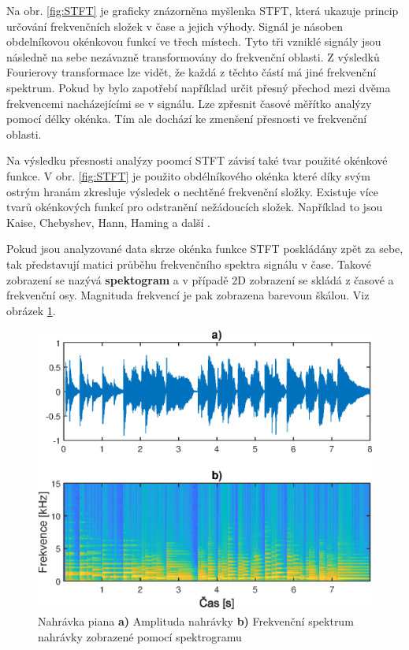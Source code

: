   Na obr. \ref{fig:STFT} je graficky znázorněna myšlenka \acs{STFT}, která ukazuje princip určování frekvenčních složek v čase a jejich výhody. 
  Signál je násoben obdelníkovou okénkovou funkcí ve třech místech.
  Tyto tři vzniklé signály jsou následně na sebe nezávazně transformovány do frekvenční oblasti.
  Z výsledků Fourierovy transformace lze vidět, že každá z těchto částí má jiné frekvenční spektrum.
  Pokud by bylo zapotřebí například určit přesný přechod mezi dvěma frekvencemi nacházejícími se v signálu. Lze zpřesnit časové měřítko analýzy pomocí délky okénka.
  Tím ale dochází ke zmenšení přesnosti ve frekvenční oblasti.
  
  Na výsledku přesnosti analýzy poomcí \acs{STFT} závisí také tvar použité okénkové funkce.
  V obr. \ref{fig:STFT} je použito obdélníkového okénka které díky svým ostrým hranám zkresluje výsledek o nechtěné frekvenční složky.
  Existuje více tvarů okénkových funkcí pro odstranění nežádoucích složek.
  Například to jsou Kaise, Chebyshev, Hann, Haming a další \cite{Time-frequency_distributions}.
  
  Pokud jsou analyzované data skrze okénka funkce \acs{STFT} poskládány zpět za sebe, tak představují matici průběhu frekvenčního spektra signálu v čase.
  Takové zobrazení se nazývá \textbf{spektogram} a v případě 2D zobrazení se skládá z časové a frekvenční osy.
  Magnituda frekvencí je pak zobrazena barevoun škálou. Viz obrázek \ref{fig:Spectrogram}.

  \begin{figure}[H]
    \centering
    \includegraphics[width = 0.8\linewidth]{obrazky/Spectrogam.eps}
    \caption{Nahrávka piana \textbf{a)} Amplituda nahrávky \textbf{b)} Frekvenční spektrum nahrávky zobrazené pomocí spektrogramu}
    \label{fig:Spectrogram}
  \end{figure}

